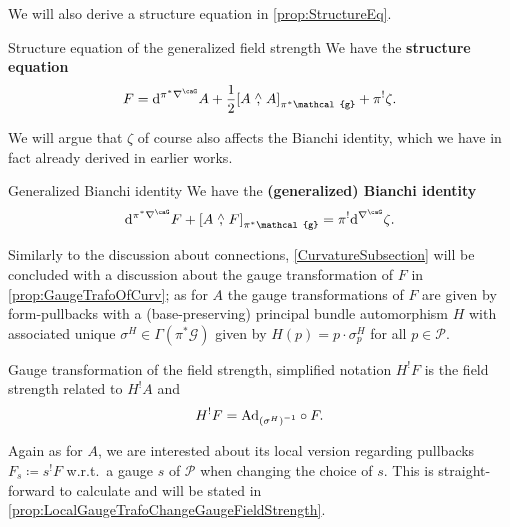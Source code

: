 \documentclass[reqno,a4paper,oneside]{amsart}
\theoremstyle{plain}
\theoremstyle{remark}
\theoremstyle{definition}
\begin{document}
We will also derive a structure equation in \ref{prop:StructureEq}.

\begin{propositions*}{Structure equation of the generalized field strength}
We have the \textbf{structure equation}
\begin{equation*}
F
=
\mathrm{d}^{\pi^*\nabla^\caG} A
	+ \frac{1}{2} \mleft[ A \stackrel{\wedge}{,} A \mright]_{\pi^*\mathcal{g}}
	+ \pi^!\zeta.
\end{equation*}
\end{propositions*}

We will argue  that $\zeta$ of course also affects the Bianchi identity, which we have in fact already derived in earlier works.

\begin{lemmata*}{Generalized Bianchi identity}
We have the \textbf{(generalized) Bianchi identity}
\begin{equation*}
\mathrm{d}^{\pi^*\nabla^\caG}F
	+ \mleft[ A \stackrel{\wedge}{,} F \mright]_{\pi^*\mathcal{g}}
=
\pi^! \mathrm{d}^{\nabla^\caG} \zeta.
\end{equation*}
\end{lemmata*}

Similarly to the discussion about connections, \ref{CurvatureSubsection} will be concluded with a discussion about the gauge transformation of $F$ in \ref{prop:GaugeTrafoOfCurv}; as for $A$ the gauge transformations of $F$ are given by form-pullbacks with a (base-preserving) principal bundle automorphism $H$ with associated unique $\sigma^H \in \Gamma(\pi^*\mathcal{G})$ given by $H(p) = p \cdot \sigma^H_p$ for all $p \in \mathcal{P}$.

\begin{propositions*}{Gauge transformation of the field strength, simplified notation}
$H^!F$ is the field strength related to $H^!A$ and
\begin{equation*}
H^!F
=
{\mathrm{Ad}_{\mleft(\sigma^H\mright)^{-1}}} \circ F.
\end{equation*}
\end{propositions*}

Again as for $A$, we are interested about its local version regarding pullbacks $F_s \coloneqq s^!F$ w.r.t.\ a gauge $s$ of $\mathcal{P}$ when changing the choice of $s$. This is straight-forward to calculate and will be stated in \ref{prop:LocalGaugeTrafoChangeGaugeFieldStrength}.
\end{document}

